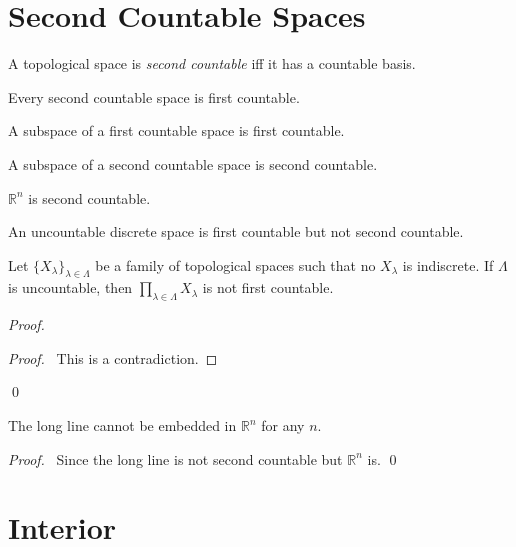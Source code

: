 \section{Second Countable Spaces}

\begin{df}
A topological space is \emph{second countable} iff it has a countable basis.
\end{df}

Every second countable space is first countable.

A subspace of a first countable space is first countable.

A subspace of a second countable space is second countable.

$\mathbb{R}^n$ is second countable.

An uncountable discrete space is first countable but not second countable.

\begin{prop}
Let $\{ X_\lambda \}_{\lambda \in \Lambda}$ be a family of topological spaces such that no $X_\lambda$ is indiscrete. If $\Lambda$ is uncountable, then $\prod_{\lambda \in \Lambda} X_\lambda$ is not first countable.
\end{prop}

\begin{proof}
\pf
{}
\qedstep
\begin{proof}
\pf\ This is a contradiction.
\end{proof}
\qed
\end{proof}

\begin{prop}
The long line cannot be embedded in $\mathbb{R}^n$ for any $n$.
\end{prop}

\begin{proof}
\pf\ Since the long line is not second countable but $\mathbb{R}^n$ is. \qed
\end{proof}

\section{Interior}

